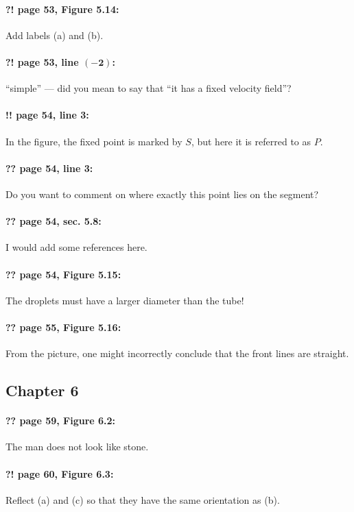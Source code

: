 \documentclass[twoside]{article}
\begin{document}
\paragraph{?! page 53, Figure 5.14:} Add labels (a) and (b).

\paragraph{?! page 53, line $\bm{(-2)}$:} “simple” — did you mean to say that “it has a fixed velocity field”?

\paragraph{!! page 54, line 3:} In the figure, the fixed point is marked by $S$, but here it is referred to as $P$.

\paragraph{?? page 54, line 3:} Do you want to comment on where exactly this point lies on the segment?

\paragraph{?? page 54, sec. 5.8:} I would add some references here.

\paragraph{?? page 54, Figure 5.15:} The droplets must have a larger diameter than the tube!

\paragraph{?? page 55, Figure 5.16:} From the picture, one might incorrectly conclude that the front lines are straight.

\subsection*{Chapter 6}

\paragraph{?? page 59, Figure 6.2:} The man does not look like stone.

\paragraph{?! page 60, Figure 6.3:} Reflect (a) and (c) so that they have the same orientation as (b).
\end{document}
